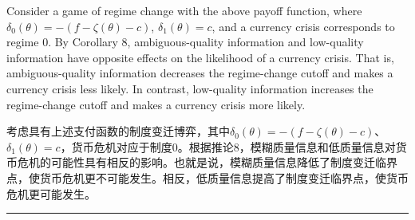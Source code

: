 \documentclass[12pt,a4paper]{article}
\newenvironment{original}
  {\par\medskip\noindent\color{black}\ignorespaces}
  {\par\medskip}
\newenvironment{translation}
  {\par\noindent\color{darkblue}\ignorespaces}
  {\par\medskip\noindent\hrule\par\medskip}
\theoremstyle{definition}
\theoremstyle{remark}
\begin{document}
\begin{original}
Consider a game of regime change with the above payoff function, where $\delta_0(\theta) = -(f - \zeta(\theta) - c)$, $\delta_1(\theta) = c$, and a currency crisis corresponds to regime 0. By Corollary 8, ambiguous-quality information and low-quality information have opposite effects on the likelihood of a currency crisis. That is, ambiguous-quality information decreases the regime-change cutoff and makes a currency crisis less likely. In contrast, low-quality information increases the regime-change cutoff and makes a currency crisis more likely.
\end{original}
\begin{translation}
考虑具有上述支付函数的制度变迁博弈，其中$\delta_0(\theta) = -(f - \zeta(\theta) - c)$、$\delta_1(\theta) = c$，货币危机对应于制度0。根据推论8，模糊质量信息和低质量信息对货币危机的可能性具有相反的影响。也就是说，模糊质量信息降低了制度变迁临界点，使货币危机更不可能发生。相反，低质量信息提高了制度变迁临界点，使货币危机更可能发生。
\end{translation}
\end{document}
